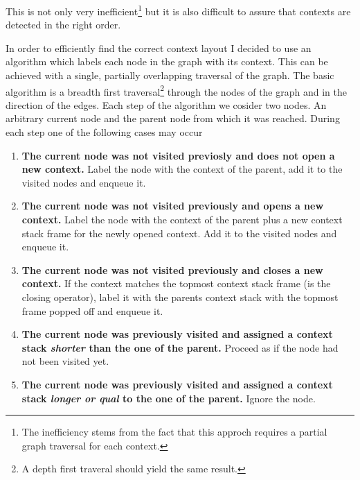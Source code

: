This is not only very inefficient\footnote{The inefficiency stems from the fact that this approch requires a partial graph traversal for each context.} but it is also difficult to assure that contexts are detected in the right order.

In order to efficiently find the correct context layout I decided to use an algorithm which labels each node in the graph with its context.
This can be achieved with a single, partially overlapping traversal of the graph.
The basic algorithm is a breadth first traversal\footnote{A depth first traveral should yield the same result.} through the nodes of the graph and in the direction of the edges.
Each step of the algorithm we cosider two nodes.
An arbitrary current node and the parent node from which it was reached.
During each step one of the following cases may occur
\begin{enumerate}
    \item \textbf{The current node was not visited previosly and does not open a new context.} Label the node with the context of the parent, add it to the visited nodes and enqueue it.
    \item \textbf{The current node was not visited previously and opens a new context.} Label the node with the context of the parent plus a new context stack frame for the newly opened context. Add it to the visited nodes and enqueue it.
    \item \textbf{The current node was not visited previously and closes a new context.} If the context matches the topmost context stack frame (is the closing operator), label it with the parents context stack with the topmost frame popped off and enqueue it.
    \item \textbf{The current node was previously visited and assigned a context stack \textit{shorter} than the one of the parent.} Proceed as if the node had not been visited yet.
    \item \textbf{The current node was previously visited and assigned a context stack \textit{longer or qual} to the one of the parent.} Ignore the node.
\end{enumerate}

